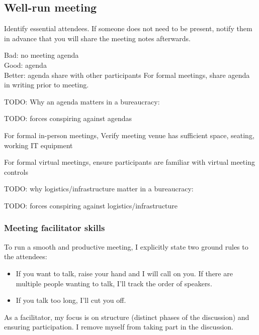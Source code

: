 \subsection{Well-run meeting\label{well-run_meeting}}

Identify essential attendees. If someone does not need to be present, notify them in advance that you will share the meeting notes afterwards. 


Bad: no meeting agenda\\
Good: agenda\\
Better: agenda share with other participants
For formal meetings, share agenda in writing prior to meeting. 

TODO: Why an agenda matters in a bureaucracy: 

TODO: forces conspiring against agendas


For formal in-person meetings, Verify meeting venue has sufficient space, seating, working IT equipment

For formal virtual meetings, ensure participants are familiar with virtual meeting controls

TODO: why logistics/infrastructure matter in a bureaucracy:

TODO: forces conspiring against logistics/infrastructure



\subsubsection{Meeting facilitator skills}

To run a smooth and productive meeting, I explicitly state two ground rules to the attendees:
\begin{itemize}
    \item If you want to talk, raise your hand and I will call on you. If there are multiple people wanting to talk, I'll track the order of speakers.
    \item If you talk too long, I'll cut you off. 
\end{itemize}

As a facilitator, my focus is on structure (distinct phases of the discussion) and ensuring participation. I remove myself from taking part in the discussion.